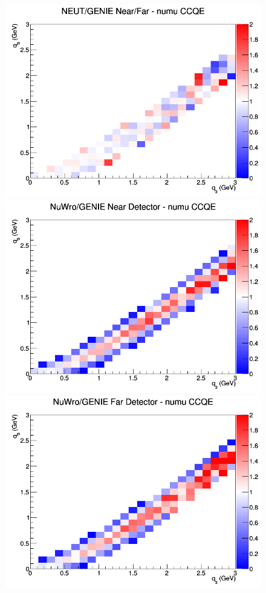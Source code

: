 \begin{figure}[h]
\endminipage
{}
\includegraphics[width=\linewidth]{q0_q3/nominal/ratios/CCQE_NEUT_GENIE_numu_NF_q3_q0.png}
\endminipage
\newline
{}
\includegraphics[width=\linewidth]{q0_q3/nominal/ratios/CCQE_NuWro_GENIE_numu_near_q3_q0.png}
\endminipage
{}
\includegraphics[width=\linewidth]{q0_q3/nominal/ratios/CCQE_NuWro_GENIE_numu_far_q3_q0.png}

\end{figure}
